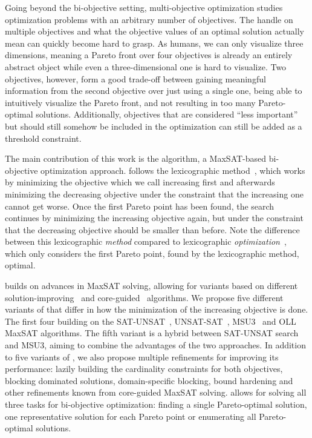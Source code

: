 Going beyond the bi-objective setting, multi-objective optimization studies optimization problems with an arbitrary number of objectives.
The handle on multiple objectives and what the objective values of an optimal solution actually mean can quickly become hard to grasp.
As humans, we can only visualize three dimensions, meaning a Pareto front over four objectives is already an entirely abstract object while even a three-dimensional one is hard to visualize.
Two objectives, however, form a good trade-off between gaining meaningful information from the second objective over just using a single one, being able to intuitively visualize the Pareto front, and not resulting in too many Pareto-optimal solutions.
Additionally, objectives that are considered ``less important'' but should still somehow be included in the optimization can still be added as a threshold constraint.

The main contribution of this work is the \algname{} algorithm, a MaxSAT-based bi-objective optimization approach.
\algname{} follows the lexicographic method~\autocite{survey}, which works by minimizing the objective which we call increasing first and afterwards minimizing the decreasing objective under the constraint that the increasing one cannot get worse.
Once the first Pareto point has been found, the search continues by minimizing the increasing objective again, but under the constraint that the decreasing objective should be smaller than before.
Note the difference between this lexicographic \emph{method} compared to lexicographic \emph{optimization}~\autocite{DBLP:conf/ijcai/ArgelichLS09,DBLP:journals/amai/Marques-SilvaAGL11}, which only considers the first Pareto point, found by the lexicographic method, optimal.

\algname{} builds on advances in MaxSAT solving, allowing for variants based on different solution-improving~\autocites{handbook2-maxsat,DBLP:journals/jsat/BerreP10,DBLP:journals/jsat/EenS06} and core-guided~\autocites{DBLP:journals/corr/abs-0712-1097,DBLP:conf/sat/AnsoteguiBL09,DBLP:conf/cp/MorgadoDM14,DBLP:journals/jsat/IgnatievMM19} algorithms.
We propose five different variants of \algname{} that differ in how the minimization of the increasing objective is done.
The first four building on the SAT-UNSAT~\autocite{DBLP:journals/jsat/BerreP10}, UNSAT-SAT~\autocite{DBLP:conf/sat/FuM06}, MSU3~\autocite{DBLP:journals/corr/abs-0712-1097} and OLL~\autocite{DBLP:conf/cp/MorgadoDM14} MaxSAT algorithms.
The fifth variant is a hybrid between SAT-UNSAT search and MSU3, aiming to combine the advantages of the two approaches.
In addition to five variants of \algname{}, we also propose multiple refinements for improving its performance:
lazily building the cardinality constraints for both objectives, blocking dominated solutions, domain-specific blocking, bound hardening and other refinements known from core-guided MaxSAT solving.
\algname{} allows for solving all three tasks for bi-objective optimization:
finding a single Pareto-optimal solution, one representative solution for each Pareto point or enumerating all Pareto-optimal solutions.

